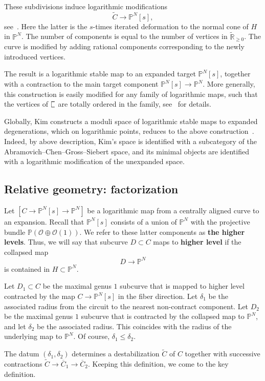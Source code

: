 \documentclass[11pt]{amsart}
\newcommand{\plC}{\scalebox{0.8}[1.3]{$\sqsubset$}}
\renewcommand{\to}{\rightarrow}
\theoremstyle{definition}
\theoremstyle{definition}
\begin{document}
These subdivisions induce logarithmic modifications
\[
\widetilde C\to \mathbb P^N[s],
\]
see~\cite{AW}. Here the latter is the $s$-times iterated deformation to the normal cone of $H$ in $\mathbb P^N$. The number of components is equal to the number of vertices in $\widetilde{\mathbb R}_{\geq 0}$. The curve is modified by adding rational components corresponding to the newly introduced vertices.

The result is a logarithmic stable map to an expanded target $\mathbb P^N[s]$, together with a contraction to the main target component $\mathbb P^N[s]\to\mathbb P^N$. More generally, this construction is easily modified for any family of logarithmic maps, such that the vertices of $\plC$ are totally ordered in the family, see~\cite{} for details.

Globally, Kim constructs a moduli space of logarithmic stable maps to expanded degenerations, which on logarithmic points, reduces to the above construction~\cite{KimLog}. Indeed, by above description, Kim's space is identified with a subcategory of the Abramovich--Chen--Gross--Siebert space, and its minimal objects are identified with a logarithmic modification of the unexpanded space.

\subsection{Relative geometry: factorization}\label{subsection factorisation} Let $[C\to \mathbb P^N[s]\to \mathbb P^N]$ be a logarithmic map from a centrally aligned curve to an expansion. Recall that $\mathbb P^N[s]$ consists of a union of $\mathbb P^N$ with the projective bundle $\mathbb P(\mathcal O\oplus \mathcal O(1))$. We refer to these latter components as \textbf{the higher levels}. Thus, we will say that subcurve $D\subset C$ maps to \textbf{higher level} if the collapsed map
\[
D\to \mathbb P^N
\]
is contained in $H\subset \mathbb P^N$. 

Let $D_1\subset C$ be the maximal genus $1$ subcurve that is mapped to higher level contracted by the map $C\to \mathbb P^N[s]$ in the fiber direction. Let $\delta_1$ be the associated radius from the circuit to the nearest non-contract component. Let $D_2$ be the maximal genus $1$ subcurve that is contracted by the collapsed map to $\mathbb P^N$, and let $\delta_2$ be the associated radius. This coincides with the radius of the underlying map to $\mathbb P^N$. Of course, $\delta_1\leq \delta_2$.

The datum $(\delta_1,\delta_2)$ determines a destabilization $\widetilde C$ of $C$ together with successive contractions $\widetilde C\to \overline C_1\to\overline C_2$. Keeping this definition, we come to the key definition.
\end{document}
